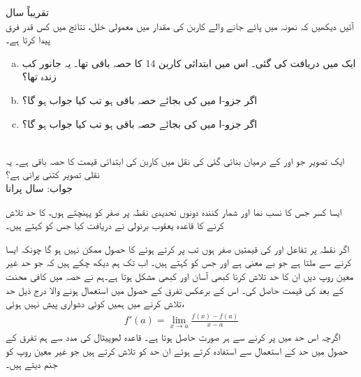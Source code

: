 تقریباً  سال
\\
آئیں دیکھیں کہ نمونہ میں پائے جانے والے کاربن کی مقدار میں معمولی خلل، نتائج میں کس قدر فرق پیدا کرتا ہے۔
\begin{enumerate}[a.]
\item
ایک   میں دریافت کی گئی۔ اس میں ابتدائی کاربن 14 کا  حصہ باقی تھا۔ یہ جانور کب زندہ تھا؟
\item
اگر جزو-ا میں  کی بجائے  حصہ باقی ہو تب کیا جواب ہو گا؟
\item
اگر جزو-ا میں  کی بجائے  حصہ باقی ہو تب کیا جواب ہو گا؟
\end{enumerate}
\\
ایک تصویر جو  اور  کے درمیان بنائی گئی کی نقل میں کاربن  کی ابتدائی قیمت کا  حصہ باقی ہے۔ یہ نقلی تصویر کتنی پرانی ہے؟\\
جواب:\quad
{} سال پرانا

ایسا کسر جس کا نسب نما اور شمار کنندہ دونوں تحدیدی نقطہ پر  صفر کو پہنچتے ہوں، کا حد تلاش کرنے کا قاعدہ یعقوب برنولی نے دریافت کیا جس کو  کہتے ہیں۔

اگر نقطہ  پر تفاعل  اور  کی قیمتیں صفر ہوں تب  پر کرتے ہوئے   کا حصول ممکن نہیں ہو گا چونکہ ایسا کرنے سے  ملتا ہے جو بے معنی ہے اور  جس کو  کہتے ہیں۔ اب تک ہم دیکھ چکے ہیں کہ جو حد غیر معین روپ دیں ان کا حد تلاش کرنا کبھی آسان اور کبھی مشکل ہوتا ہے۔ہم نے حصہ  میں کافی محنت کے بعد  کی قیمت حاصل کی۔ اس کے برعکس تفرق کے حصول میں استعمال ہونے والا درج ذیل حد تلاش کرنے میں ہمیں کوئی دشواری پیش نہیں ہوئی،
\begin{align*}
f'(a)=\lim_{x\to a}\frac{f(x)-f(a)}{x-a}
\end{align*}
اگرچہ اس حد میں  پر کرنے سے ہر صورت  حاصل ہوتا ہے۔ قاعدہ لھوپیٹال  کی مدد سے ہم تفرق کے حصول میں حد کے استعمال سے استفادہ کرتے ہوئے ان حد کو تلاش کرتے ہیں جو غیر معین روپ کو جنم دیتے ہیں۔

